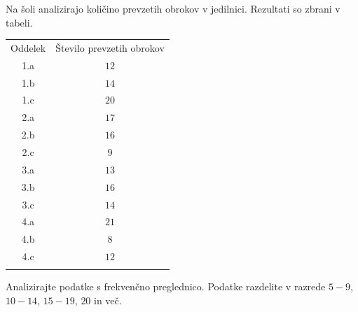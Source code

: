        
                    \begin{naloga}
                        Na šoli analizirajo količino prevzetih obrokov v jedilnici. Rezultati so zbrani v tabeli. 
        
                            \begin{table}[H]
                                \centering
                                \begin{tabular}{||c|c||} 
                                \hhline{|t:==:t|}
                                \rowcolor[rgb]{0.843,0.718,0.718} 
                                Oddelek  & Število prevzetih obrokov   \\ 
                                \hhline{|:==:|}
                                1.a & $12$    \\ 
                                \hline
                                1.b & $14$    \\ 
                                \hline
                                1.c & $20$    \\ 
                                \hline
                                2.a & $17$     \\
                                \hline
                                2.b & $16$     \\
                                \hline
                                2.c & $9$     \\
                                \hline
                                3.a & $13$     \\
                                \hline
                                3.b & $16$     \\
                                \hline
                                3.c & $14$     \\
                                \hline
                                4.a & $21$     \\                    
                                \hline
                                4.b  & $8$     \\
                                \hline
                                4.c  & $12$     \\
                                \hhline{|b:==:b|}
                                \end{tabular}
                            \end{table}
                        
                        Analizirajte podatke s frekvenčno preglednico.
                        Podatke razdelite v razrede $5-9$, $10-14$, $15-19$, $20$ in več.
                    \end{naloga}

